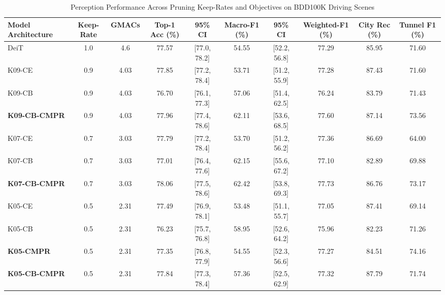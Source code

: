 \begin{table}[t]
\centering
\caption{Perception Performance Across Pruning Keep-Rates and Objectives on BDD100K Driving Scenes}
\label{tab:cross_keep_rate}
\small
\begin{tabular}{lccccccccc}
\hline
\textbf{Model Architecture} & \textbf{Keep-Rate} & \textbf{GMACs} & \textbf{Top-1 Acc (\%)} & \textbf{95\% CI} & \textbf{Macro-F1 (\%)} & \textbf{95\% CI} & \textbf{Weighted-F1 (\%)} & \textbf{City Rec (\%)} & \textbf{Tunnel F1 (\%)} \\
\hline
DeiT & 1.0 & 4.6 & 77.57 & [77.0, 78.2] & 54.55 & [52.2, 56.8] & 77.29 & 85.95 & 71.60 \\
K09-CE & 0.9 & 4.03 & 77.85 & [77.2, 78.4] & 53.71 & [51.2, 55.9] & 77.28 & 87.43 & 71.60 \\
K09-CB & 0.9 & 4.03 & 76.70 & [76.1, 77.3] & 57.06 & [51.4, 62.5] & 76.24 & 83.79 & 71.43 \\
\textbf{K09-CB-CMPR} & 0.9 & 4.03 & 77.96 & [77.4, 78.6] & 62.11 & [53.6, 68.5] & 77.60 & 87.14 & 73.56 \\
K07-CE & 0.7 & 3.03 & 77.79 & [77.2, 78.4] & 53.70 & [51.2, 56.2] & 77.36 & 86.69 & 64.00 \\
K07-CB & 0.7 & 3.03 & 77.01 & [76.4, 77.6] & 62.15 & [55.6, 67.2] & 77.10 & 82.89 & 69.88 \\
\textbf{K07-CB-CMPR} & 0.7 & 3.03 & 78.06 & [77.5, 78.6] & 62.42 & [53.8, 69.3] & 77.73 & 86.76 & 73.17 \\
K05-CE & 0.5 & 2.31 & 77.49 & [76.9, 78.1] & 53.48 & [51.1, 55.7] & 77.05 & 87.41 & 69.14 \\
K05-CB & 0.5 & 2.31 & 76.23 & [75.7, 76.8] & 58.95 & [52.6, 64.2] & 75.96 & 82.23 & 71.26 \\
\textbf{K05-CMPR} & 0.5 & 2.31 & 77.35 & [76.8, 77.9] & 54.55 & [52.3, 56.6] & 77.27 & 84.51 & 74.16 \\
\textbf{K05-CB-CMPR} & 0.5 & 2.31 & 77.84 & [77.3, 78.4] & 57.36 & [52.5, 62.9] & 77.32 & 87.79 & 71.74 \\
\hline
\end{tabular}
\end{table}

